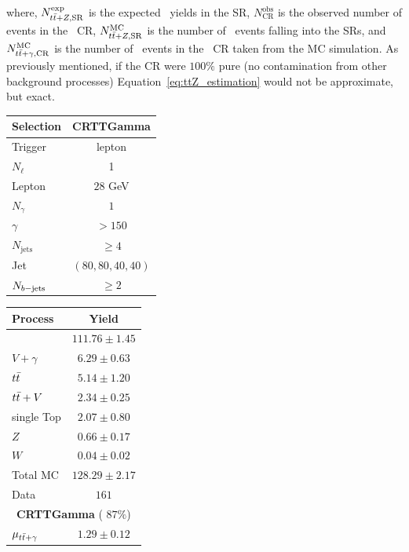 		\noindent where, $N_{t\bar{t}+Z,\mathrm{SR}}^{\mathrm{exp}}$ is the expected \ttZ\ yields in the \ac{SR}, $N_{\mathrm{CR}}^{\mathrm{obs}}$ is the observed number of events in the \ttgamma\ \ac{CR}, $N_{t\bar{t}+Z,\mathrm{SR}}^{\mathrm{MC}}$ is the number of \ttZ\ events falling into the \acp{SR}, and $N_{t\bar{t}+\gamma,\mathrm{CR}}^{\mathrm{MC}}$ is the number of \ttgamma\ events in the \ttgamma\ \ac{CR} taken from the \ac{MC} simulation. As previously mentioned, if the \ac{CR} were $100\%$ pure (no contamination from other background processes) Equation~\ref{eq:ttZ_estimation} would not be approximate, but exact.

		\begin{table}
			\parbox{.45\linewidth}{
			\centering
			\label{tab:CRTTGamma}
		   	\begin{tabular}{lc}
			      \toprule
			      \textbf{Selection}  & \textbf{CRTTGamma} \\
			      \toprule
			      Trigger & lepton \\ 
			      $N_{\ell}$ & 1 \\
			      Lepton \pt & $28$ GeV \\
			      \midrule
			      $N_{\gamma}$ & $1$\\
			      $\gamma$ \pT\ & $> 150$ \GeV \\
			      \midrule
			      $N_{\mathrm{jets}}$ & $ \geq 4 $ \\
			      Jet \pT\ & $(80,80,40,40)$ \GeV \\
			      $N_{b\mathrm{-jets}}$ & $\ge 2$ \\
			      \bottomrule
			   \end{tabular}
			}
			\hfill
			\parbox{.45\linewidth}{
			\centering
			\label{tab:CRTTGamma_yields}
				\begin{tabular}{lc}
					\toprule
					\textbf{Process} & \textbf{Yield} \\
					\toprule
					\ttgamma & $111.76 \pm 1.45$ \\
					$V+\gamma$ & $6.29 \pm 0.63$ \\
					$t\bar{t}$ & $5.14 \pm 1.20$ \\
					$t\bar{t}+V$ & $2.34 \pm 0.25$ \\
					single Top & $2.07 \pm 0.80$ \\
					$Z$ & $0.66 \pm 0.17$ \\
					$W$ & $0.04 \pm 0.02$ \\
					\midrule
					Total MC & $128.29 \pm 2.17$ \\
					Data & $161$ \\
					\midrule
					\multicolumn{2}{c}{\textbf{CRTTGamma} ( $87\%$)} \\ 
					\midrule
					$\mu_{t\bar{t}+\gamma}$ & $1.29 \pm 0.12$ \\
					\bottomrule
				\end{tabular}
			}
		\end{table}

